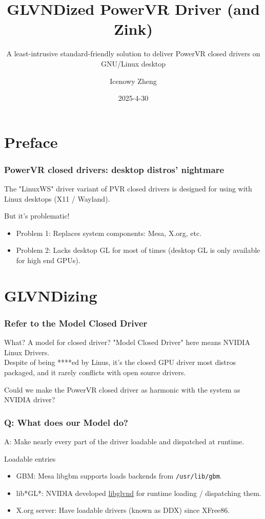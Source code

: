 \documentclass{beamer}
\title{GLVNDized PowerVR Driver (and Zink)}
\subtitle{A least-intrusive standard-friendly solution to deliver PowerVR closed drivers on GNU/Linux desktop}
\author{Icenowy Zheng}
\institute{PLCT Lab}
\date{2025-4-30}
\begin{document}
\section{Preface}

\frame{\titlepage}

\begin{frame}
	\frametitle{PowerVR closed drivers: desktop distros' nightmare}
	The "LinuxWS" driver variant of PVR closed drivers is designed for using with Linux desktops (X11 / Wayland).
	\begin{block}{But it's problematic!}
		\begin{itemize}
			\item Problem 1: Replaces system components: Mesa, X.org, etc.
			\item Problem 2: Lacks desktop GL for most of times (desktop GL is only available for high end GPUs).
		\end{itemize}
	\end{block}
\end{frame}

\section{GLVNDizing}

\begin{frame}
	\frametitle{Refer to the Model Closed Driver}
	\begin{block}{What? A model for closed driver?}
		"Model Closed Driver" here means NVIDIA Linux Drivers. \\
		Despite of being ****ed by Linus, it's the closed GPU driver most distros packaged, and it rarely conflicts with open source drivers.
	\end{block}
	Could we make the PowerVR closed driver as harmonic with the system as NVIDIA driver?
\end{frame}

\begin{frame}
	\frametitle{Q: What does our Model do?}
	A: Make nearly every part of the driver loadable and dispatched at runtime.

	\begin{block}{Loadable entries}
		\begin{itemize}
			\item GBM: Mesa libgbm supports loads backends from \texttt{/usr/lib/gbm}.
			\item lib*GL*: NVIDIA developed \href{https://gitlab.freedesktop.org/glvnd/libglvnd}{libglvnd} for runtime loading / dispatching them.
			\item X.org server: Have loadable drivers (known as DDX) since XFree86.
		\end{itemize}
	\end{block}
\end{frame}
\end{document}
